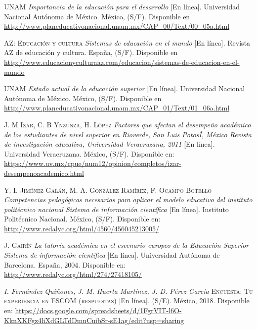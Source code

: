 
\begin{thebibliography}{X}

		\textsc{UNAM}
		\textit{Importancia de la educación para el desarrollo} [En línea].
		Universidad Nacional Autónoma de México. México, (S/F). 
		\newline
		Disponible en 
		\url{http://www.planeducativonacional.unam.mx/CAP_00/Text/00_05a.html}

		\textsc{AZ: Educación y cultura}
		\textit{Sistemas de educación en el mundo} [En línea].
		Revista AZ de educación y cultura. España, (S/F). 
		\newline
		Disponible en 
		\url{http://www.educacionyculturaaz.com/educacion/sistemas-de-educacion-en-el-mundo}

		\textsc{UNAM}
		\textit{Estado actual de la educación superior} [En línea]. 
		Universidad Nacional Autónoma de México. México, (S/F). 
		\newline
		Disponible en
		\url{ http://www.planeducativonacional.unam.mx/CAP_01/Text/01_06a.html}

		\textsc{J. M Izar, C. B Ynzunza, H. López}
		\textit{Factores que afectan el desempeño académico de los estudiantes de 
		nivel superior en Rioverde, San Luis PotosÍ, México Revista de investigación 
		educativa, Universidad Veracruzana, 2011} [En línea]. 
		Universidad Veracruzana. México, (S/F). 
		\newline
		Disponible en:
		\url{https://www.uv.mx/cpue/num12/opinion/completos/izar-desempenoacademico.html}

		\textsc{Y. I. Jiménez Galán, M. A. González Ramírez, F. Ocampo Botello}
		\textit{Competencias pedagógicas necesarias para aplicar el modelo educativo 
		del instituto politécnico nacional Sistema de información científica} [En línea].
		Instituto Politécnico Nacional. México, (S/F). 
		\newline
		Disponible en:
		\url{http://www.redalyc.org/html/4560/456045213005/}

		\textsc{J. Gairín}
		\textit{La tutoría académica en el escenario europeo de la Educación Superior 
		Sistema de información científica} [En línea]. 
		Universidad Autónoma de Barcelona. España, 2004. 
		\newline
		Disponible en:
		\url{http://www.redalyc.org/html/274/27418105/}

		\textit{I. Fernández Quiñones, J. M. Huerta Martínez, J. D. Pérez García}
		\textsc{Encuesta: Tu experiencia en ESCOM (respuestas)} [En línea].
		(S/E). México, 2018. 
		\newline
		Disponible en: 
		\url{https://docs.google.com/spreadsheets/d/1FgrVIT-l6O-KknXKFgz4liXdGLTdDmnCuibSr-sE1ag/edit?usp=sharing}	


\end{thebibliography}
